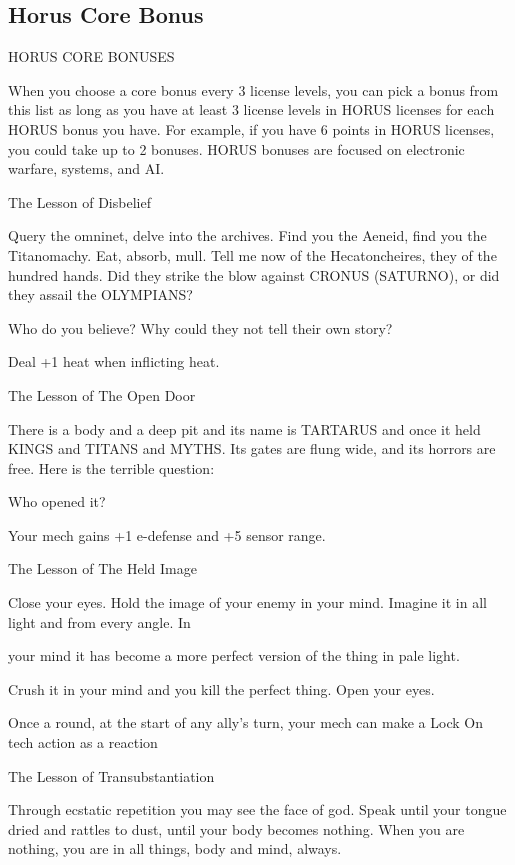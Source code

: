 \subsection{Horus Core Bonus}

                                      HORUS CORE BONUSES

When you choose a core bonus every 3 license levels, you can pick a bonus from this list as long
as you have at least 3 license levels in HORUS licenses for each HORUS bonus you have. For
example, if you have 6 points in HORUS licenses, you could take up to 2 bonuses. HORUS
bonuses are focused on electronic warfare, systems, and AI.


The Lesson of Disbelief

Query the omninet, delve into the archives. Find you the Aeneid, find you the Titanomachy. Eat, absorb,
mull. Tell me now of the Hecatoncheires, they of the hundred hands. Did they strike the blow against
CRONUS (SATURNO), or did they assail the OLYMPIANS?

Who do you believe? Why could they not tell their own story?

Deal +1 heat when inflicting heat.


The Lesson of The Open Door

There is a body and a deep pit and its name is TARTARUS and once it held KINGS and TITANS and
MYTHS. Its gates are flung wide, and its horrors are free. Here is the terrible question:

Who opened it?

Your mech gains +1 e-defense and +5 sensor range.


The Lesson of The Held Image

Close your eyes. Hold the image of your enemy in your mind. Imagine it in all light and from every angle. In

your mind it has become a more perfect version of the thing in pale light.

Crush it in your mind and you kill the perfect thing. Open your eyes.

Once a round, at the start of any ally’s turn, your mech can make a Lock On tech action as a
reaction


The Lesson of Transubstantiation

Through ecstatic repetition you may see the face of god. Speak until your tongue dried and rattles to dust,
until your body becomes nothing. When you are nothing, you are in all things, body and mind, always.

